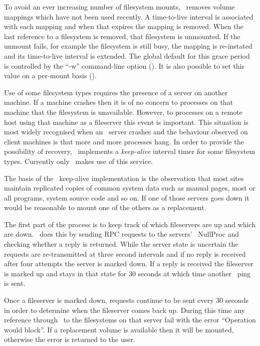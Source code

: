 
To avoid an ever increasing number of filesystem mounts, \amd\ removes
volume mappings which have not been used recently.  A time-to-live interval
is associated with each mapping and when that expires the mapping is removed.
When the last reference to a filesystem is removed, that filesystem is unmounted.
If the unmount fails, for example the filesystem is still busy, the mapping
is re-instated and its time-to-live interval is extended.
The global default for this grace period is controlled by the ``-w'' command-line
option (\see {}).  It is also possible to set this value on a per-mount basis
(\see {}).

\label{keepalives}

Use of some filesystem types requires the presence of a server on another machine.
If a machine crashes then it is of no concern to processes on that machine
that the filesystem is unavailable.  However, to processes on a remote host using
that machine as a fileserver this event is important.  This situation is
most widely recognised when an \NFS\ server crashes and the behaviour observed
on client machines is that more and more processes hang.
In order to provide the possibility of recovery, \amd\ implements a {\em keep-alive}
interval timer for some filesystem types.
Currently only \NFS\ makes use of this service.

The basis of the \NFS\ keep-alive implementation is the observation that
most sites maintain replicated copies of common system data such as manual
pages, most or all programs, system source code and so on.
If one of those servers goes down it would be reasonable to mount one of
the others as a replacement.

The first part of the process is to keep track of which fileservers are up and
which are down.  \Amd\ does this by sending RPC requests to the servers'
\NFS\ {\sc NullProc} and checking whether a reply is returned.
While the server state is uncertain the requests are re-transmitted
at three second intervals and if no reply is received after four attempts
the server is marked down.  If a reply is received the fileserver is marked
up and stays in that state for 30 seconds at which time another \NFS\ ping is sent.

Once a fileserver is marked down, requests continue to be sent every 30 seconds
in order to determine when the fileserver comes back up.  During this time
any reference through \amd\ to the filesystems on that server fail with the
error ``Operation would block''.
If a replacement volume is available then it will be mounted, otherwise
the error is returned to the user.

